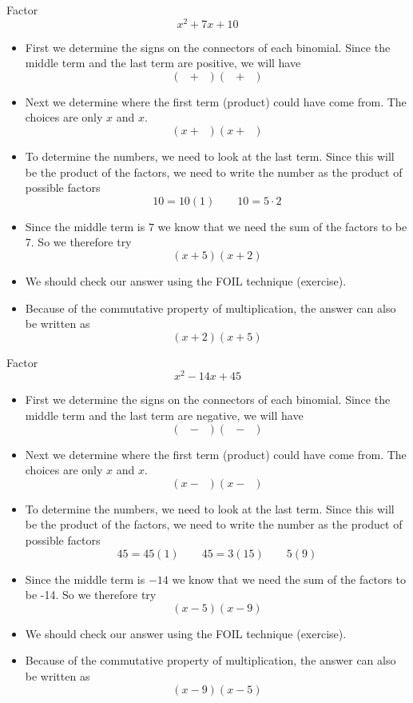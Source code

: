 \begin{myexample}
Factor
\[
	x^2+7x+10
\]
{}
\end{myexample}
\begin{myProof}
	\begin{itemize}
		\item First we determine the signs on the connectors of each binomial. Since
		the middle term and the last term are positive, we will have
		\[
			(\phantom{x}+\phantom{x})(\phantom{x}+\phantom{x})
		\]
		\item Next we determine where the first term (product) could have come from. 
		The choices are only $x$ and $x$. 
		\[
			(x+\phantom{x})(x+\phantom{x})
		\]
		\item To determine the numbers, we need to look at the last term. Since this will
		be the product of the factors, we need to write the number as the product of possible
		factors
		\[
			10 = 10(1)	\qquad 10 = 5 \cdot 2	
		\]
		\item Since the middle term is $7$ we know that we need the sum of the factors to be 7. 
		So we therefore try
		\[
			(x+5)(x+2)
		\]
		\item We should check our answer using the FOIL technique (exercise).
		\item Because of the commutative property of multiplication, the answer can also be written as
		\[
			(x+2)(x+5)
		\]
	\end{itemize}
\end{myProof} 

\begin{myexample}
Factor
\[
	x^2-14x+45
\]
{}
\end{myexample}
\begin{myProof}
	\begin{itemize}
		\item First we determine the signs on the connectors of each binomial. Since
		the middle term and the last term are negative, we will have
		\[
			(\phantom{x}-\phantom{x})(\phantom{x}-\phantom{x})
		\]
		\item Next we determine where the first term (product) could have come from. 
		The choices are only $x$ and $x$. 
		\[
			(x-\phantom{x})(x-\phantom{x})
		\]
		\item To determine the numbers, we need to look at the last term. Since this will
		be the product of the factors, we need to write the number as the product of possible
		factors
		\[
			45=45(1)\qquad 45=3(15)\qquad 5(9)
		\]
		\item Since the middle term is $-14$ we know that we need the sum of the factors to be -14. 
		So we therefore try
		\[
			(x-5)(x-9)
		\]
		\item We should check our answer using the FOIL technique (exercise).
		\item Because of the commutative property of multiplication, the answer can also be written as
		\[
			(x-9)(x-5)
		\]
	\end{itemize}
\end{myProof} 

